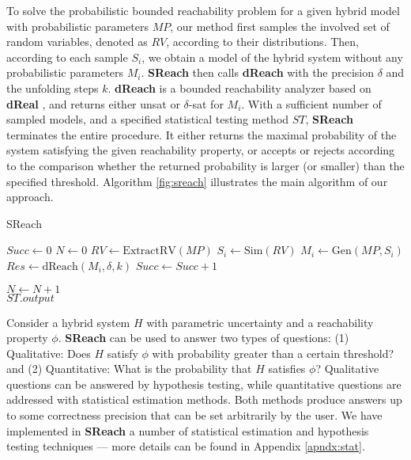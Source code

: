 To solve the probabilistic bounded reachability problem for a given hybrid model with probabilistic parameters $MP$, our method first samples the involved set of random variables, denoted as $RV$, according to their distributions. Then, according to each sample $S_i$, we obtain a model of the hybrid system without any probabilistic parameters $M_i$. {\bf SReach} then calls {\bf dReach} \cite{gaodelta} with the precision $\delta$ and the unfolding steps $k$. {\bf dReach} is a bounded reachability analyzer based on {\bf dReal} \cite{gao2013dreal}, and returns either unsat or $\delta$-sat for $M_i$. With a sufficient number of sampled models, and a specified statistical testing method $ST$, {\bf SReach} terminates the entire procedure. It either returns the maximal probability of the system satisfying the given reachability property, or accepts or rejects according to the comparison whether the returned probability is larger (or smaller) than the specified threshold. Algorithm \ref{fig:sreach} illustrates the main algorithm of our approach.
\begin{algorithm}
  \centering
  \caption{SReach}
  \label{fig:sreach}
  \begin{algorithmic}[1]
        \State $Succ \gets 0$	
        \State $N \gets 0$	
        \State $RV \gets \mathrm{ExtractRV}(MP)$	
        \Repeat
            \State $S_i \gets \mathrm{Sim}(RV)$		
            \State $M_i \gets \mathrm{Gen}(MP, S_i)$	
            \State $Res \gets \mathrm{dReach}(M_i, \delta, k)$	
		\State $Succ \gets Succ + 1$
	    
	  \EndIf
	\State $N \gets N + 1$
        	\\
	\quad\hspace{0.5ex} \Return $ST.output$
   \EndFunction
  \end{algorithmic}
\end{algorithm}

Consider a hybrid system $H$ with parametric uncertainty  and a reachability property $\phi$. {\bf SReach} 
can be used to answer two types of questions: (1) Qualitative: Does $H$ satisfy $\phi$ with probability
greater than a certain threshold? and (2) Quantitative: What is the probability that $H$ satisfies $\phi$?
Qualitative questions can be answered by hypothesis testing, while quantitative questions are addressed with
statistical estimation methods. Both methods produce answers up to some correctness 
precision that can be set arbitrarily by the user.
We have implemented in {\bf SReach} a number of statistical estimation and hypothesis testing techniques ---
more details can be found in Appendix \ref{apndx:stat}.
